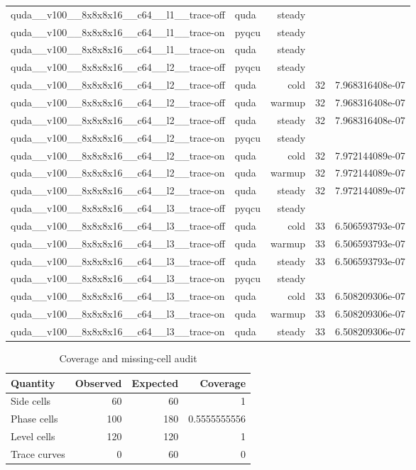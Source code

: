 \begin{table}[htbp]
\begin{tabular}{@{}llrrr@{}}
quda\_\_v100\_\_8x8x8x16\_\_c64\_\_l1\_\_trace-off & quda & steady &  &  \\
quda\_\_v100\_\_8x8x8x16\_\_c64\_\_l1\_\_trace-on & pyqcu & steady &  &  \\
quda\_\_v100\_\_8x8x8x16\_\_c64\_\_l1\_\_trace-on & quda & steady &  &  \\
quda\_\_v100\_\_8x8x8x16\_\_c64\_\_l2\_\_trace-off & pyqcu & steady &  &  \\
quda\_\_v100\_\_8x8x8x16\_\_c64\_\_l2\_\_trace-off & quda & cold & 32 & 7.968316408e-07 \\
quda\_\_v100\_\_8x8x8x16\_\_c64\_\_l2\_\_trace-off & quda & warmup & 32 & 7.968316408e-07 \\
quda\_\_v100\_\_8x8x8x16\_\_c64\_\_l2\_\_trace-off & quda & steady & 32 & 7.968316408e-07 \\
quda\_\_v100\_\_8x8x8x16\_\_c64\_\_l2\_\_trace-on & pyqcu & steady &  &  \\
quda\_\_v100\_\_8x8x8x16\_\_c64\_\_l2\_\_trace-on & quda & cold & 32 & 7.972144089e-07 \\
quda\_\_v100\_\_8x8x8x16\_\_c64\_\_l2\_\_trace-on & quda & warmup & 32 & 7.972144089e-07 \\
quda\_\_v100\_\_8x8x8x16\_\_c64\_\_l2\_\_trace-on & quda & steady & 32 & 7.972144089e-07 \\
quda\_\_v100\_\_8x8x8x16\_\_c64\_\_l3\_\_trace-off & pyqcu & steady &  &  \\
quda\_\_v100\_\_8x8x8x16\_\_c64\_\_l3\_\_trace-off & quda & cold & 33 & 6.506593793e-07 \\
quda\_\_v100\_\_8x8x8x16\_\_c64\_\_l3\_\_trace-off & quda & warmup & 33 & 6.506593793e-07 \\
quda\_\_v100\_\_8x8x8x16\_\_c64\_\_l3\_\_trace-off & quda & steady & 33 & 6.506593793e-07 \\
quda\_\_v100\_\_8x8x8x16\_\_c64\_\_l3\_\_trace-on & pyqcu & steady &  &  \\
quda\_\_v100\_\_8x8x8x16\_\_c64\_\_l3\_\_trace-on & quda & cold & 33 & 6.508209306e-07 \\
quda\_\_v100\_\_8x8x8x16\_\_c64\_\_l3\_\_trace-on & quda & warmup & 33 & 6.508209306e-07 \\
quda\_\_v100\_\_8x8x8x16\_\_c64\_\_l3\_\_trace-on & quda & steady & 33 & 6.508209306e-07 \\
\bottomrule
\end{tabular}
\end{table}

\begin{table}[htbp]
\centering
\caption{Coverage and missing-cell audit}
\small
\begin{tabular}{@{}lrrr@{}}
\toprule
Quantity & Observed & Expected & Coverage \\
\midrule
Side cells & 60 & 60 & 1 \\
Phase cells & 100 & 180 & 0.5555555556 \\
Level cells & 120 & 120 & 1 \\
Trace curves & 0 & 60 & 0 \\
\bottomrule
\end{tabular}
\end{table}
